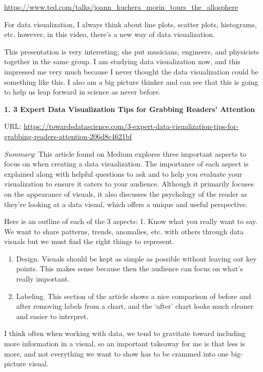 \documentclass[]{book}
\theoremstyle{definition}
\theoremstyle{definition}
\theoremstyle{definition}
\theoremstyle{remark}
\begin{document}
\url{https://www.ted.com/talks/joann_kuchera_morin_tours_the_allosphere}

For data visualization, I always think about line plots, scatter plots,
histograms, etc. however, in this video, there's a new way of data
visualization.

This presentation is very interesting; she put musicians, engineers, and
physicists together in the same group. I am studying data visualization
now, and this impressed me very much because I never thought the data
visualization could be something like this. I also am a big picture
thinker and can see that this is going to help us leap forward in
science as never before.

\textbf{1. 3 Expert Data Visualization Tips for Grabbing Readers'
Attention}

URL:
\url{https://towardsdatascience.com/3-expert-data-visualization-tips-for-grabbing-readers-attention-206d8c4621bf}

\emph{Summary}: This article found on Medium explores three important
aspects to focus on when creating a data visualization. The importance
of each aspect is explained along with helpful questions to ask and to
help you evaluate your visualization to ensure it caters to your
audience. Although it primarily focuses on the appearance of visuals, it
also discusses the psychology of the reader as they're looking at a data
visual, which offers a unique and useful perspective.

Here is an outline of each of the 3 aspects: 1. Know what you really
want to say. We want to share patterns, trends, anomalies, etc. with
others through data visuals but we must find the right things to
represent.

\begin{enumerate}
\def\labelenumi{\arabic{enumi}.}
\setcounter{enumi}{1}
\item
  Design. Visuals should be kept as simple as possible without leaving
  out key points. This makes sense because then the audience can focus
  on what's really important.
\item
  Labeling. This section of the article shows a nice comparison of
  before and after removing labels from a chart, and the `after' chart
  looks much cleaner and easier to interpret.
\end{enumerate}

I think often when working with data, we tend to gravitate toward
including more information in a visual, so an important takeaway for me
is that less is more, and not everything we want to show has to be
crammed into one big-picture visual.
\end{document}
